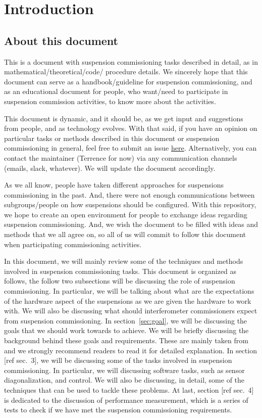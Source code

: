 \section{Introduction}

\subsection{About this document}
This is a document with suspension commissioning tasks described in detail, as in mathematical/theoretical/code/ procedure details.
We sincerely hope that this document can serve as a handbook/guideline for suspension commissioning, and as an educational document for people, who want/need to participate in suspension commission activities, to know more about the activities.

This document is dynamic, and it should be, as we get input and suggestions from people, and as technology evolves.
With that said, if you have an opinion on particular tasks or methods described in this document or suspension commissioning in general, feel free to submit an issue \href{https://github.com/gw-vis/vis-commissioning-tex/issues}{here}.
Alternatively, you can contact the maintainer (Terrence for now) via any communication channels (emails, slack, whatever).
We will update the document accordingly.

As we all know, people have taken different approaches for suspensions commissioning in the past.
And, there were not enough communications between subgroups/people on how suspensions should be configured.
With this repository, we hope to create an open environment for people to exchange ideas regarding suspension commissioning.
And, we wish the document to be filled with ideas and methods that we all agree on, so all of us will commit to follow this document when participating commissioning activities.

In this document, we will mainly review some of the techniques and methods involved in suspension commissioning tasks.
This document is organized as follows, the follow two subsections will be discussing the role of suspension commissioning.
In particular, we will be talking about what are the expectations of the hardware aspect of the suspensions as we are given the hardware to work with.
We will also be discussing what should interferometer commissioners expect from suspension commissioning.
In section~\ref{sec:goal}, we will be discussing the goals that we should work towards to achieve. We will be briefly discussing the background behind these goals and requirements.
These are mainly taken from \cite{Sekiguchi:2016bmv} and we strongly recommend readers to read it for detailed explanation.
In section [ref sec.~3], we will be discussing some of the tasks involved in suspension commissioning.
In particular, we will discussing software tasks, such as sensor diagonalization, and control.
We will also be discussing, in detail, some of the techniques that can be used to tackle these problems.
At last, section [ref sec.~4] is dedicated to the discussion of performance measurement, which is a series of tests to check if we have met the suspension commissioning requirements.


